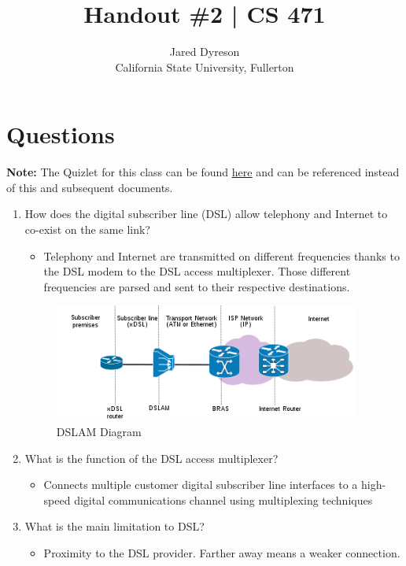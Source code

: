 \documentclass{article}
\title{Handout \#2 | CS 471}
\author{Jared Dyreson\\ 
        California State University, Fullerton}
\begin{document}
\maketitle
\tableofcontents

\newpage

\section{Questions}

\textbf{Note: } The Quizlet for this class can be found \href{https://quizlet.com/480232264/471-1-6-flash-cards/}{\underline{here}} and can be referenced instead of this and subsequent documents.

\begin{enumerate}

\item How does the digital subscriber line (DSL) allow telephony and Internet to co-exist on the same link?
\begin{itemize}
\item Telephony and Internet are transmitted on different frequencies thanks to the DSL modem to the DSL access multiplexer. Those different frequencies are parsed and sent to their respective destinations.
\end{itemize}
\begin{figure}[!h]
\centering
\includegraphics[width=10cm]{DSLAM_Diagram}
\caption{DSLAM Diagram}
\end{figure}

\item What is the function of the DSL access multiplexer?
\begin{itemize}
\item Connects multiple customer digital subscriber line interfaces to a high-speed digital communications channel using multiplexing techniques
\end{itemize}

\item What is the main limitation to DSL?
\begin{itemize}
\item Proximity to the DSL provider. Farther away means a weaker connection.
\end{itemize}


\end{enumerate}
\end{document}
